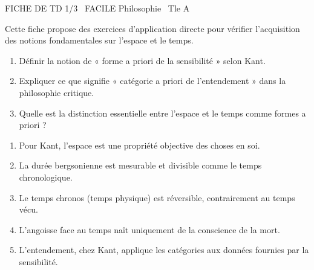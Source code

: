 \documentclass[11pt]{article}
\begin{document}
\begin{tcolorbox}[enhanced,colback=popink,colframe=popink,arc=10pt,boxrule=0pt,left=12pt,right=12pt,top=9pt,bottom=9pt]
{\color{white}\popxbold\small FICHE DE TD 1/3 \textbullet\ FACILE \hfill Philosophie \textbullet\ Tle A\par}
\end{tcolorbox}
\vspace{4pt}
Cette fiche propose des exercices d'application directe pour vérifier l'acquisition des notions fondamentales sur l'espace et le temps.

\begin{exercice}
\begin{enumerate}
    \item Définir la notion de « forme a priori de la sensibilité » selon Kant.
    \item Expliquer ce que signifie « catégorie a priori de l'entendement » dans la philosophie critique.
    \item Quelle est la distinction essentielle entre l'espace et le temps comme formes a priori ?
\end{enumerate}
\end{exercice}

\begin{exercice}
\begin{enumerate}
    \item Pour Kant, l'espace est une propriété objective des choses en soi.
    \item La durée bergsonienne est mesurable et divisible comme le temps chronologique.
    \item Le temps chronos (temps physique) est réversible, contrairement au temps vécu.
    \item L'angoisse face au temps naît uniquement de la conscience de la mort.
    \item L'entendement, chez Kant, applique les catégories aux données fournies par la sensibilité.
\end{enumerate}
\end{exercice}
\end{document}
